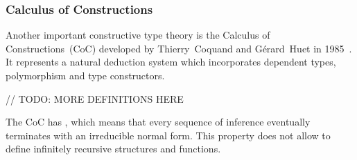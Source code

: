 \documentclass[article]{aaltoseries}
\begin{document}
\subsubsection{Calculus of Constructions}

Another important constructive type theory is the Calculus of Constructions~(CoC) developed by Thierry~Coquand and Gérard~Huet in 1985~\cite{Coq85}. It represents a natural deduction system which incorporates dependent types, polymorphism and type constructors.

// TODO: MORE DEFINITIONS HERE


The CoC has , which means that every sequence of inference eventually terminates with an irreducible normal form. This property does not allow to define infinitely recursive structures and functions. %

%
\end{document}
